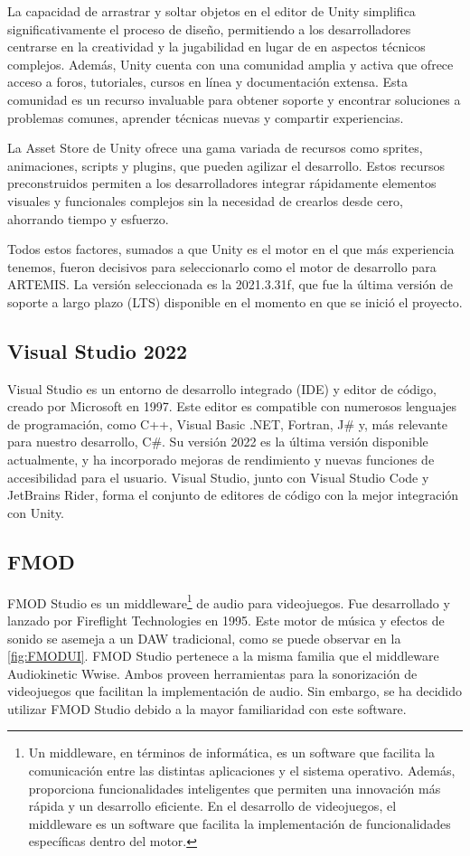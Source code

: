 La capacidad de arrastrar y soltar objetos en el editor de Unity simplifica significativamente el proceso de diseño, permitiendo a los desarrolladores centrarse en la creatividad y la jugabilidad en lugar de en aspectos técnicos complejos. Además, Unity cuenta con una comunidad amplia y activa que ofrece acceso a foros, tutoriales, cursos en línea y documentación extensa. Esta comunidad es un recurso invaluable para obtener soporte y encontrar soluciones a problemas comunes, aprender técnicas nuevas y compartir experiencias.

La Asset Store de Unity ofrece una gama variada de recursos como sprites, animaciones, scripts y plugins, que pueden agilizar el desarrollo. Estos recursos preconstruidos permiten a los desarrolladores integrar rápidamente elementos visuales y funcionales complejos sin la necesidad de crearlos desde cero, ahorrando tiempo y esfuerzo.

Todos estos factores, sumados a que Unity es el motor en el que más experiencia tenemos, fueron decisivos para seleccionarlo como el motor de desarrollo para ARTEMIS. La versión seleccionada es la 2021.3.31f, que fue la última versión de soporte a largo plazo (LTS) disponible en el momento en que se inició el proyecto.

\subsection{Visual Studio 2022}

Visual Studio es un entorno de desarrollo integrado (IDE) y editor de código, creado por Microsoft en 1997. Este editor es compatible con numerosos lenguajes de programación, como C++, Visual Basic .NET, Fortran, J\# y, más relevante para nuestro desarrollo, C\#. Su versión 2022 es la última versión disponible actualmente, y ha incorporado mejoras de rendimiento y nuevas funciones de accesibilidad para el usuario. Visual Studio, junto con Visual Studio Code y JetBrains Rider, forma el conjunto de editores de código con la mejor integración con Unity.

\subsection{FMOD}

FMOD Studio es un middleware\footnote{Un middleware, en términos de informática, es un software que facilita la comunicación entre las distintas aplicaciones y el sistema operativo. Además, proporciona funcionalidades inteligentes que permiten una innovación más rápida y un desarrollo eficiente. En el desarrollo de videojuegos, el middleware es un software que facilita la implementación de funcionalidades específicas dentro del motor.} de audio para videojuegos. Fue desarrollado y lanzado por Fireflight Technologies en 1995. Este motor de música y efectos de sonido se asemeja a un DAW tradicional, como se puede observar en la \autoref{fig:FMODUI}. FMOD Studio pertenece a la misma familia que el middleware Audiokinetic Wwise. Ambos proveen herramientas para la sonorización de videojuegos que facilitan la implementación de audio. Sin embargo, se ha decidido utilizar FMOD Studio debido a la mayor familiaridad con este software.

